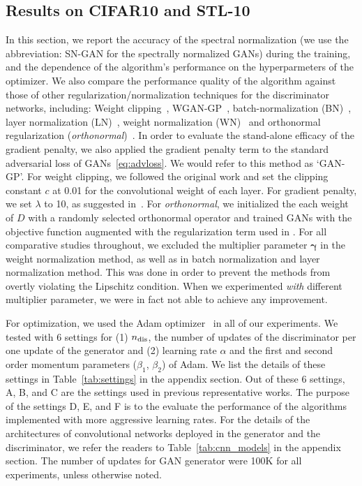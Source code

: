 \documentclass{article}
\newcommand{\bmgamma}{{\bm \gamma}}
\begin{document}
\subsection{Results on CIFAR10 and STL-10}
In this section, we report the accuracy of the spectral normalization (we use the abbreviation: SN-GAN for the spectrally normalized GANs) during the training, and the dependence of the algorithm's performance on the hyperparmeters of the optimizer.
We also compare the performance quality of the algorithm against those of other regularization/normalization techniques for the discriminator networks, including:
Weight clipping~\cite[]{arjovsky2017wasserstein}, WGAN-GP~\cite[]{gulrajani2017improved}, batch-normalization (BN)~\cite[]{ioffe2015batch}, layer normalization (LN)~\cite[]{ba2016layer}, weight normalization (WN)~\cite[]{salimans2016weight} and orthonormal regularization (\textit{orthonormal})~\cite[]{brock2016neural}.
In order to evaluate the stand-alone efficacy of the gradient penalty, we also applied the gradient penalty term to the standard adversarial loss of GANs~\eqref{eq:advloss}.
We would refer to this method as `GAN-GP'.
For weight clipping, we followed the original work \cite{arjovsky2017wasserstein} and set the clipping constant $c$ at 0.01 for the convolutional weight of each layer.
For gradient penalty, we set $\lambda$ to 10, as suggested in~\cite{gulrajani2017improved}.
For \textit{orthonormal}, we initialized the each weight of $D$ with a randomly selected orthonormal operator and trained GANs with the objective function augmented with the regularization term used in \cite{brock2016neural}.
For all comparative studies throughout, we excluded the multiplier parameter $\bmgamma$ in the weight normalization method, as well as in batch normalization and layer normalization method.
This was done in order to prevent the methods from overtly violating the Lipschitz condition.
When we experimented \textit{with} different multiplier parameter, we were in fact not able to achieve any improvement.

For optimization, we used the Adam optimizer~\cite{kingma2014adam} in all of our experiments.
We tested with 6 settings for (1) $n_{\rm dis}$, the number of updates of the discriminator per one update of the generator and (2) learning rate $\alpha$ and the first and second order momentum parameters ($\beta_1$, $\beta_2$) of Adam.
We list the details of these settings in Table~\ref{tab:settings} in the appendix section.
Out of these 6 settings, A, B, and C are the settings used in previous representative works.
The purpose of the settings D, E, and F is to the evaluate the performance of the algorithms implemented with more aggressive learning rates. For the details of the architectures of convolutional networks deployed in the generator and the discriminator, we refer the readers to Table~\ref{tab:cnn_models} in the appendix section.
The number of updates for GAN generator were 100K for all experiments, unless otherwise noted.
\end{document}
